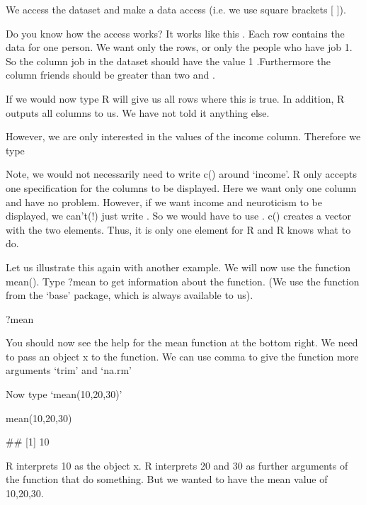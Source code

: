 We access the dataset and make a data access (i.e. we use square brackets [ ]).

Do you know how the access works? It works like this . Each row contains the data for one person. We want only the rows, or only the people who have job 1. So the column job in the dataset should have the value 1 .Furthermore the column friends should be greater than two and .

If we would now type  R will give us all rows where this is true. In addition, R outputs all columns to us. We have not told it anything else.

However, we are only interested in the values of the income column. Therefore we type 

Note, we would not necessarily need to write c() around ‘income’. R only accepts one specification for the columns to be displayed. Here we want only one column and have no problem. However, if we want income and neuroticism to be displayed, we can’t(!) just write .
%
So we would have to use . c() creates a vector with the two elements. Thus, it is only one element for R and R knows what to do.

Let us illustrate this again with another example. We will now use the function mean(). Type ?mean to get information about the function. (We use the function from the ‘base’ package, which is always available to us).

\begin{rblock1}
	?mean
\end{rblock1}

You should now see the help for the mean function at the bottom right. We need to pass an object x to the function. We can use comma to give the function more arguments ‘trim’ and ‘na.rm’

Now type ‘mean(10,20,30)’

\begin{rblock1}
mean(10,20,30)

## [1] 10
\end{rblock1}
	
R interprets 10 as the object x. R interprets 20 and 30 as further arguments of the function that do something. But we wanted to have the mean value of 10,20,30.

